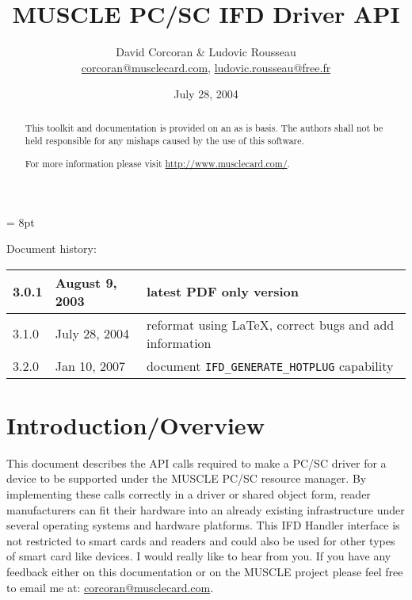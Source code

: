 \documentclass[a4paper,12pt]{article}
\title{MUSCLE PC/SC IFD Driver API}
\author{David Corcoran \& Ludovic Rousseau\\
\url{corcoran@musclecard.com}, \url{ludovic.rousseau@free.fr}}
\date{July 28, 2004}
\begin{document}
\maketitle

\begin{abstract}
This toolkit and documentation is provided on an as is basis. The
authors shall not be held responsible for any mishaps caused by the use
of this software.

For more information please visit \url{http://www.musclecard.com/}.

\end{abstract}

\parskip = 8pt

\addtolength{\parindent}{-\parindent}

Document history: \\
\begin{tabular}{|l|l|l|}
\hline
3.0.1 & August 9, 2003 & latest PDF only version \\
\hline
3.1.0 & July 28, 2004 & reformat using \LaTeX{}, correct bugs and add
information \\
\hline
3.2.0 & Jan 10, 2007 & document \texttt{IFD\_GENERATE\_HOTPLUG} capability \\
\hline
\end{tabular}

\newpage
\tableofcontents
\newpage

\section{Introduction/Overview}

This document describes the API calls required to make a PC/SC driver
for a device to be supported under the MUSCLE PC/SC resource manager. By
implementing these calls correctly in a driver or shared object form,
reader manufacturers can fit their hardware into an already existing
infrastructure under several operating systems and hardware platforms.
This IFD Handler interface is not restricted to smart cards and readers
and could also be used for other types of smart card like devices. I
would really like to hear from you. If you have any feedback either on
this documentation or on the MUSCLE project please feel free to email me
at: \url{corcoran@musclecard.com}.



\end{document}
